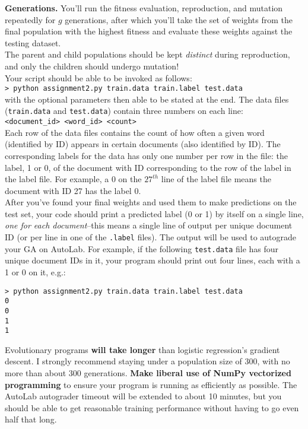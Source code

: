 \documentclass[paper=a4, fontsize=11pt]{scrartcl} %
\numberwithin{figure}{section} %
\numberwithin{table}{section} %
\begin{document}
\textbf{Generations.} You'll run the fitness evaluation, reproduction, and mutation repeatedly for $g$ generations, after which you'll take the set of weights from the final population with the highest fitness and evaluate these weights against the testing dataset. \\

The parent and child populations should be kept \emph{distinct} during reproduction, and only the children should undergo mutation! \\

Your script should be able to be invoked as follows: \\

\texttt{> python assignment2.py train.data train.label test.data} \\

with the optional parameters then able to be stated at the end. The data files (\texttt{train.data} and \texttt{test.data}) contain three numbers on each line: \\

\texttt{<document\_id> <word\_id> <count>} \\

Each row of the data files contains the count of how often a given word (identified by ID) appears in certain documents (also identified by ID). The corresponding labels for the data has only one number per row in the file: the label, 1 or 0, of the document with ID corresponding to the row of the label in the label file. For example, a 0 on the $27^{th}$ line of the label file means the document with ID 27 has the label 0. \\

After you've found your final weights and used them to make predictions on the test set, your code should print a predicted label (0 or 1) by itself on a single line, \emph{one for each document}--this means a single line of output per unique document ID (or per line in one of the \texttt{.label} files). The output will be used to autograde your GA on AutoLab. For example, if the following \texttt{test.data} file has four unique document IDs in it, your program should print out four lines, each with a 1 or 0 on it, e.g.:

\begin{verbatim}
> python assignment2.py train.data train.label test.data
0
0
1
1
\end{verbatim}

Evolutionary programs \textbf{will take longer} than logistic regression's gradient descent. I strongly recommend staying under a population size of 300, with no more than about 300 generations. \textbf{Make liberal use of NumPy vectorized programming} to ensure your program is running as efficiently as possible. The AutoLab autograder timeout will be extended to about 10 minutes, but you should be able to get reasonable training performance without having to go even half that long.
\end{document}
